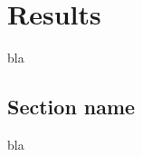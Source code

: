 \chapter{Results}
\label{chap:eval_results}

\noindent bla

\section{Section name}

\noindent bla
\newline
